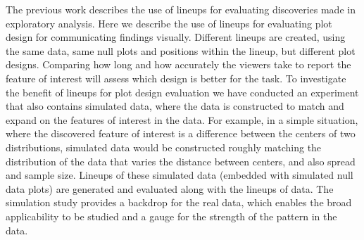 The previous work \cite{buja:2009,wickham:2010} describes the use of lineups for evaluating discoveries made in exploratory analysis. Here we describe the use of lineups for evaluating plot design for communicating findings visually. Different lineups are created, using the same data, same null plots and positions within the lineup, but different plot designs. Comparing how long and how accurately the viewers take to report the feature of interest will assess which design is better for the task. To investigate the benefit of lineups for plot design evaluation we have conducted an experiment that also contains simulated data, where the data is constructed to match and expand on the features of interest in the data. For example, in a simple situation, where the discovered feature of interest is a difference between the centers of two distributions, simulated data would be constructed roughly matching the distribution of the data that varies the distance between centers, and also spread and sample size. Lineups of these simulated data (embedded with simulated null data plots) are generated and evaluated along with the lineups of data. The simulation study provides a backdrop for the real data, which enables the broad applicability to be studied and a gauge for the strength of the pattern in the data.




